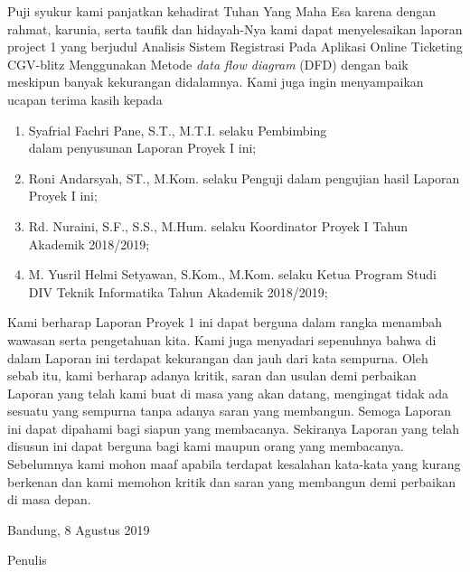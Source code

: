 \begin{acknowledgements}
\par
Puji syukur kami panjatkan kehadirat Tuhan Yang Maha Esa karena dengan rahmat, karunia, serta taufik dan hidayah-Nya kami dapat menyelesaikan laporan project 1 yang berjudul Analisis  Sistem Registrasi Pada Aplikasi Online Ticketing CGV-blitz Menggunakan Metode \textit{data flow diagram} (DFD) dengan baik meskipun banyak kekurangan didalamnya. Kami juga ingin menyampaikan ucapan terima kasih kepada
\begin{enumerate}

\item Syafrial Fachri Pane, S.T., M.T.I. selaku Pembimbing \\ dalam penyusunan Laporan Proyek I ini;
\item Roni Andarsyah, ST., M.Kom. selaku Penguji dalam pengujian hasil Laporan Proyek I ini;
\item	Rd. Nuraini, S.F., S.S., M.Hum. selaku Koordinator Proyek I Tahun Akademik 2018/2019;
\item	M. Yusril Helmi Setyawan, S.Kom., M.Kom. selaku Ketua Program Studi DIV Teknik Informatika Tahun Akademik 2018/2019;

\end{enumerate}
\par 
 Kami berharap Laporan Proyek 1 ini dapat berguna dalam rangka menambah wawasan serta pengetahuan kita. Kami juga menyadari sepenuhnya bahwa di dalam Laporan ini terdapat kekurangan dan jauh dari kata sempurna. Oleh sebab itu, kami berharap adanya kritik, saran dan usulan demi perbaikan Laporan yang telah kami buat di masa yang akan datang, mengingat tidak ada sesuatu yang sempurna tanpa adanya saran yang membangun. Semoga Laporan ini dapat dipahami bagi siapun yang membacanya. Sekiranya Laporan yang telah disusun ini dapat berguna bagi kami maupun orang yang membacanya. Sebelumnya kami mohon maaf apabila terdapat kesalahan kata-kata yang kurang berkenan dan kami memohon kritik dan saran yang membangun demi perbaikan di masa depan.


\begin{raggedleft}

Bandung, 8 Agustus 2019

Penulis

\end{raggedleft}


\end{acknowledgements}